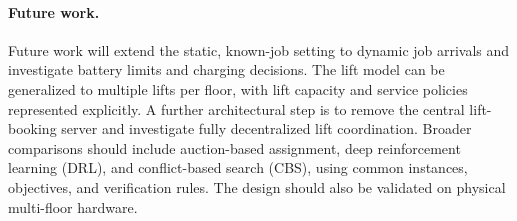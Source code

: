 \paragraph{Future work.}
Future work will extend the static, known-job setting to dynamic job arrivals
and investigate battery limits and charging decisions. The lift model can
be generalized to multiple lifts per floor, with lift capacity and service
policies represented explicitly. A further architectural step is to remove
the central lift-booking server and investigate fully decentralized lift
coordination. Broader comparisons should include auction-based assignment,
deep reinforcement learning (DRL), and conflict-based search (CBS), using
common instances, objectives, and verification rules. The design should also
be validated on physical multi-floor hardware.


